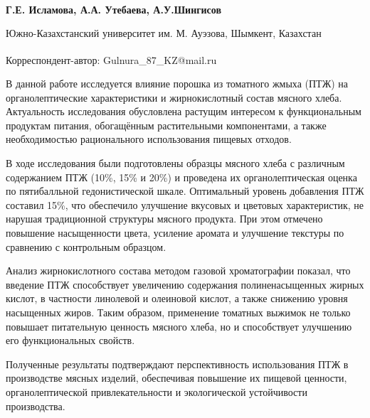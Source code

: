 
\begin{articleheader}

{\bfseries
Г.Е. Исламова\textsuperscript{\envelope },
А.А. Утебаева,
А.У.Шингисов
}
\end{articleheader}

\begin{affiliation}
Южно-Казахстанский университет им. М. Ауэзова, Шымкент, Казахстан

\raggedright \textsuperscript{\envelope }Корреспондент-автор: Gulnura\_87\_KZ@mail.ru
\end{affiliation}

В данной работе исследуется влияние порошка из томатного жмыха (ПТЖ) на
органолептические характеристики и жирнокислотный состав мясного хлеба.
Актуальность исследования обусловлена растущим интересом к
функциональным продуктам питания, обогащённым растительными
компонентами, а также необходимостью рационального использования пищевых
отходов.

В ходе исследования были подготовлены образцы мясного хлеба с различным
содержанием ПТЖ (10\%, 15\% и 20\%) и проведена их органолептическая
оценка по пятибалльной гедонистической шкале. Оптимальный уровень
добавления ПТЖ составил 15\%, что обеспечило улучшение вкусовых и
цветовых характеристик, не нарушая традиционной структуры мясного
продукта. При этом отмечено повышение насыщенности цвета, усиление
аромата и улучшение текстуры по сравнению с контрольным образцом.

Анализ жирнокислотного состава методом газовой хроматографии показал,
что введение ПТЖ способствует увеличению содержания полиненасыщенных
жирных кислот, в частности линолевой и олеиновой кислот, а также
снижению уровня насыщенных жиров. Таким образом, применение томатных
выжимок не только повышает питательную ценность мясного хлеба, но и
способствует улучшению его функциональных свойств.

Полученные результаты подтверждают перспективность использования ПТЖ в
производстве мясных изделий, обеспечивая повышение их пищевой ценности,
органолептической привлекательности и экологической устойчивости
производства.

